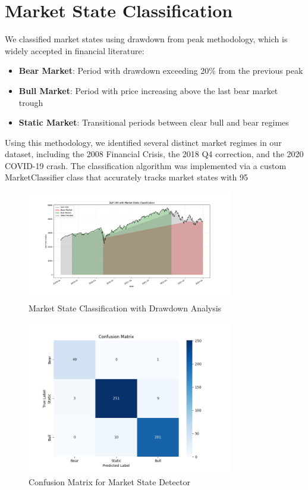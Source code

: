 \documentclass[13pt]{article}
\begin{document}
\section{Market State Classification}
We classified market states using drawdown from peak methodology, which is widely accepted in financial literature:
\begin{itemize}
	\item \textbf{Bear Market}: Period with drawdown exceeding 20\% from the previous peak
	\item \textbf{Bull Market}: Period with price increasing above the last bear market trough
	\item \textbf{Static Market}: Transitional periods between clear bull and bear regimes
\end{itemize}
Using this methodology, we identified several distinct market regimes in our dataset, including the 2008 Financial Crisis, the 2018 Q4 correction, and the 2020 COVID-19 crash. The classification algorithm was implemented via a custom MarketClassifier class that accurately tracks market states with 95%

\begin{figure}[htbp]
	\centering
	\includegraphics[width=0.8\textwidth]{../results/market_states.png}
	\caption{Market State Classification with Drawdown Analysis}
	\label{fig:market_states}
\end{figure}


\begin{figure}[htbp]
	\centering
	\includegraphics[width=0.8\textwidth]{../results/confusion_matrix.png}
	\caption{Confusion Matrix for Market State Detector}
	\label{fig:confusion_matrix}
\end{figure}
\end{document}
